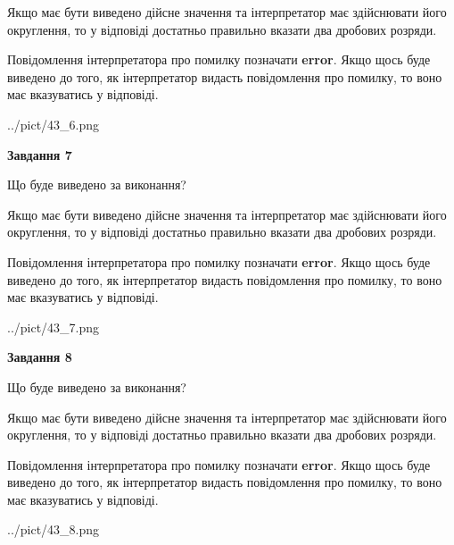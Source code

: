 \documentclass[12pt, ukrainian]{article}
\begin{document}
{\begin {Large}
Якщо має бути виведено дійсне значення та інтерпретатор має здійснювати його округлення, 
то у відповіді достатньо правильно вказати два дробових розряди.

Повідомлення інтерпретатора про помилку позначати \textbf{error}.
Якщо щось буде виведено до того, як інтерпретатор видасть повідомлення про помилку, 
то воно має вказуватись у відповіді. \par

\begin{center}
	{../pict/43_6.png}
\end{center}
\newpage

{\begin {center}\textbf{Завдання 7}\end {center}}\par
Що буде виведено за виконання? \par

Якщо має бути виведено дійсне значення та інтерпретатор має здійснювати його округлення, 
то у відповіді достатньо правильно вказати два дробових розряди.

Повідомлення інтерпретатора про помилку позначати \textbf{error}.
Якщо щось буде виведено до того, як інтерпретатор видасть повідомлення про помилку, 
то воно має вказуватись у відповіді. \par

\begin{center}
	{../pict/43_7.png}
\end{center}
\newpage

{\begin {center}\textbf{Завдання 8}\end {center}}\par
Що буде виведено за виконання? \par

Якщо має бути виведено дійсне значення та інтерпретатор має здійснювати його округлення, 
то у відповіді достатньо правильно вказати два дробових розряди.

Повідомлення інтерпретатора про помилку позначати \textbf{error}.
Якщо щось буде виведено до того, як інтерпретатор видасть повідомлення про помилку, 
то воно має вказуватись у відповіді. \par

\begin{center}
	{../pict/43_8.png}
\end{center}
\newpage


\end{Large}}
\end{document}
